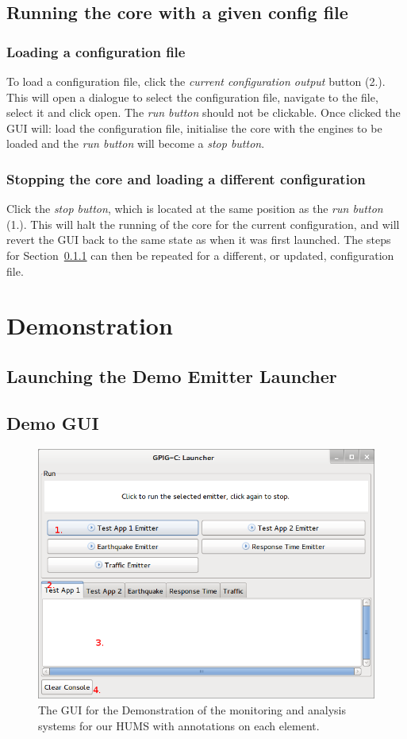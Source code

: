 \documentclass[10pt,a4paper]{article}
\begin{document}
\subsection{Running the core with a given config file}
\label{subsec:setupcore}
\subsubsection{Loading a configuration file}
\label{subsubsec:loadconf}
To load a configuration file, click the \emph{current configuration output} button (2.). This will open a dialogue to select the configuration file, navigate to the file, select it and click open. The \emph{run button} should not be clickable. Once clicked the GUI will: load the configuration file, initialise the core with the engines to be loaded and the \emph{run button} will become a \emph{stop button}.

\subsubsection{Stopping the core and loading a different configuration}
Click the \emph{stop button}, which is located at the same position as the \emph{run button} (1.). This will halt the running of the core for the current configuration, and will revert the GUI back to the same state as when it was first launched. The steps for Section~\ref{subsubsec:loadconf} can then be repeated for a different, or updated, configuration file.

\section{Demonstration}
\label{subsec:demo}
\subsection{Launching the Demo Emitter Launcher}

\subsection{Demo GUI}
\begin{figure}[H]
  \centering
  \includegraphics[width=\textwidth]{images/demo-gui.png}
  \caption{The GUI for the Demonstration of the monitoring and analysis systems for our HUMS with annotations on each element.}
  \label{fig:demogui}
\end{figure}
\end{document}
